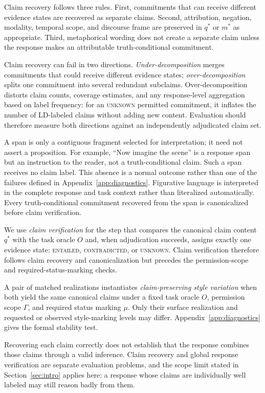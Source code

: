 \documentclass{clv2025}
\newcommand{\LD}{\textsc{LD}}
\begin{document}
Claim recovery follows three rules.
First, commitments that can receive different evidence states are recovered
as separate claims.
Second, attribution, negation, modality, temporal scope, and discourse frame
are preserved in $q^*$ or $m^*$ as appropriate.
Third, metaphorical wording does not create a separate claim unless the
response makes an attributable truth-conditional commitment.

Claim recovery can fail in two directions.
\emph{Under-decomposition} merges commitments that could receive different
evidence states; \emph{over-decomposition} splits one commitment into several
redundant subclaims.
Over-decomposition distorts claim counts, coverage estimates, and any
response-level aggregation based on label frequency: for an \textsc{unknown}
permitted commitment, it inflates the number of \LD-labeled claims without
adding new content.
Evaluation should therefore measure both directions against an independently
adjudicated claim set.

A span is only a contiguous fragment selected for interpretation; it need not
assert a proposition. For example, ``Now imagine the scene'' is a response span
but an instruction to the reader, not a truth-conditional claim. Such a span
receives no claim label. This absence is a normal outcome rather than one of the
failures defined in Appendix~\ref{app:diagnostics}.
Figurative language is interpreted in the complete response and task context
rather than literalized automatically.
Every truth-conditional commitment recovered from the span is canonicalized
before claim verification.

We use \emph{claim verification} for the step that compares the canonical
claim content $q^*$ with the task oracle $O$ and, when adjudication succeeds,
assigns exactly one evidence state: \textsc{entailed},
\textsc{contradicted}, or \textsc{unknown}.
Claim verification therefore follows claim recovery and canonicalization but
precedes the permission-scope and required-status-marking checks.

A pair of matched realizations instantiates \emph{claim-preserving style
variation} when both yield the same canonical claims under a fixed task oracle
$O$, permission scope $\Gamma$, and required status marking $\mu$.
Only their surface realization and requested or observed style-marking levels
may differ.
Appendix~\ref{app:diagnostics} gives the formal stability test.

Recovering each claim correctly does not establish that the response combines
those claims through a valid inference.
Claim recovery and global response verification are separate evaluation
problems, and the scope limit stated in Section~\ref{sec:intro} applies here:
a response whose claims are individually well labeled may still reason badly
from them.
\end{document}
